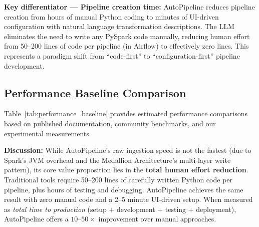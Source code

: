 \textbf{Key differentiator --- Pipeline creation time:} AutoPipeline reduces pipeline creation from hours of manual Python coding to minutes of UI-driven configuration with natural language transformation descriptions. The LLM eliminates the need to write any PySpark code manually, reducing human effort from 50--200 lines of code per pipeline (in Airflow) to effectively zero lines. This represents a paradigm shift from ``code-first'' to ``configuration-first'' pipeline development.


\subsection{Performance Baseline Comparison}

Table~\ref{tab:performance_baseline} provides estimated performance comparisons based on published documentation, community benchmarks, and our experimental measurements.

\begin{table}[ht]
\centering
\caption{Performance baseline comparison (estimated)}
\label{tab:performance_baseline}
\end{table}

\textbf{Discussion:} While AutoPipeline's raw ingestion speed is not the fastest (due to Spark's JVM overhead and the Medallion Architecture's multi-layer write pattern), its core value proposition lies in the \textbf{total human effort reduction}. Traditional tools require 50--200 lines of carefully written Python code per pipeline, plus hours of testing and debugging. AutoPipeline achieves the same result with zero manual code and a 2--5 minute UI-driven setup. When measured as \textit{total time to production} (setup + development + testing + deployment), AutoPipeline offers a $10$--$50\times$ improvement over manual approaches.

